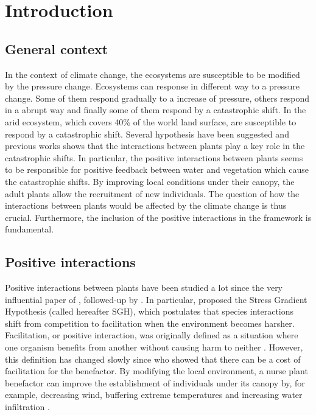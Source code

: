 \documentclass[12pt]{article} %
\begin{document}


\section{Introduction}
\subsection{General context}
In the context of climate change, the ecosystems are susceptible to be modified by the pressure change. Ecosystems can response in different way to a pressure change. Some of them respond gradually to a increase of pressure, others respond in a abrupt way and finally some of them respond by a catastrophic shift. In the arid ecosystem, which covers 40\% of the world land surface, are susceptible to respond by a catastrophic shift. Several hypothesis have been suggested and previous works shows that the interactions between plants play a key role in the catastrophic shifts. In particular, the positive interactions between plants seems to be responsible for positive feedback between water and vegetation which cause the catastrophic shifts. By improving local conditions under their canopy, the adult plants allow the recruitment of new individuals. The question of how the interactions between plants would be affected by the climate change is thus crucial. Furthermore, the inclusion of the positive interactions in the framework is fundamental.
\subsection{Positive interactions}
Positive interactions between plants have been studied a lot since the very influential paper of \citep{Bertness1994}, followed-up by \citep{Bruno2003}. In particular, \citet{Bertness1994} proposed the Stress Gradient Hypothesis (called hereafter SGH), which postulates that species interactions shift from competition to facilitation when the environment becomes harsher. Facilitation, or positive interaction, was originally defined as a situation where one organism benefits from another without causing harm to neither \citep{Bruno2003}. However, this definition has changed slowly since \citet{Schob2014} who showed that there can be a cost of facilitation for the benefactor.
By modifying the local environment, a nurse plant benefactor can improve the establishment of individuals under its canopy by, for example, decreasing wind, buffering extreme temperatures and increasing water infiltration \citep{Rietkerk1997}. 
\end{document}
